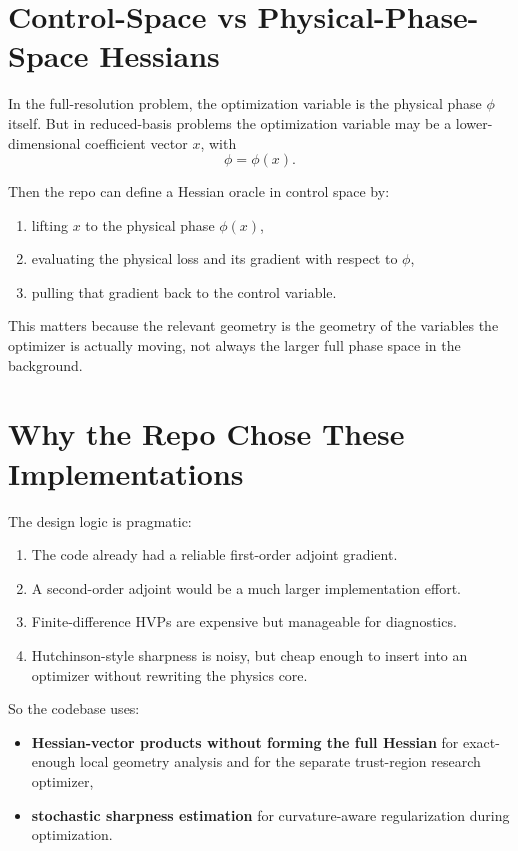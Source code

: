 \documentclass[11pt,letterpaper]{article}
\begin{document}
\section{Control-Space vs Physical-Phase-Space Hessians}

In the full-resolution problem, the optimization variable is the physical phase
$\phi$ itself. But in reduced-basis problems the optimization variable may be a
lower-dimensional coefficient vector $x$, with
\[
\phi = \phi(x).
\]

Then the repo can define a Hessian oracle in control space by:
\begin{enumerate}[leftmargin=*]
  \item lifting $x$ to the physical phase $\phi(x)$,
  \item evaluating the physical loss and its gradient with respect to $\phi$,
  \item pulling that gradient back to the control variable.
\end{enumerate}

This matters because the relevant geometry is the geometry of the variables the
optimizer is actually moving, not always the larger full phase space in the
background.

\section{Why the Repo Chose These Implementations}

The design logic is pragmatic:
\begin{enumerate}[leftmargin=*]
  \item The code already had a reliable first-order adjoint gradient.
  \item A second-order adjoint would be a much larger implementation effort.
  \item Finite-difference HVPs are expensive but manageable for diagnostics.
  \item Hutchinson-style sharpness is noisy, but cheap enough to insert into an
  optimizer without rewriting the physics core.
\end{enumerate}

So the codebase uses:
\begin{itemize}[leftmargin=*]
  \item \textbf{Hessian-vector products without forming the full Hessian} for exact-enough local
  geometry analysis and for the separate trust-region research optimizer,
  \item \textbf{stochastic sharpness estimation} for curvature-aware
  regularization during optimization.
\end{itemize}
\end{document}
